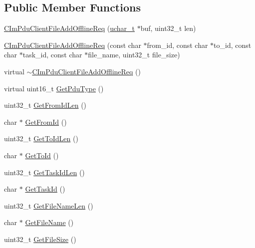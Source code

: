 \subsection*{Public Member Functions}
\begin{DoxyCompactItemize}
\item 
\hyperlink{class_c_im_pdu_client_file_add_offline_req_aee8b88b3267020e47638c945085b718a}{C\+Im\+Pdu\+Client\+File\+Add\+Offline\+Req} (\hyperlink{base_2ostype_8h_a124ea0f8f4a23a0a286b5582137f0b8d}{uchar\+\_\+t} $\ast$buf, uint32\+\_\+t len)
\item 
\hyperlink{class_c_im_pdu_client_file_add_offline_req_a7c333c66a4f4c0ff2dada67fd4155158}{C\+Im\+Pdu\+Client\+File\+Add\+Offline\+Req} (const char $\ast$from\+\_\+id, const char $\ast$to\+\_\+id, const char $\ast$task\+\_\+id, const char $\ast$file\+\_\+name, uint32\+\_\+t file\+\_\+size)
\item 
virtual \hyperlink{class_c_im_pdu_client_file_add_offline_req_a249cb4de01c4e4d28e32a8a709510bbf}{$\sim$\+C\+Im\+Pdu\+Client\+File\+Add\+Offline\+Req} ()
\item 
virtual uint16\+\_\+t \hyperlink{class_c_im_pdu_client_file_add_offline_req_a8c59110b28784a088acb15aae1832ccd}{Get\+Pdu\+Type} ()
\item 
uint32\+\_\+t \hyperlink{class_c_im_pdu_client_file_add_offline_req_ac60ef9c58a29f094d4305d5bb2e154c3}{Get\+From\+Id\+Len} ()
\item 
char $\ast$ \hyperlink{class_c_im_pdu_client_file_add_offline_req_a2b154a0cc54b8dd9b548f02d0f2470fe}{Get\+From\+Id} ()
\item 
uint32\+\_\+t \hyperlink{class_c_im_pdu_client_file_add_offline_req_a97cc09748ab07afa56cb26bdacdd1484}{Get\+To\+Id\+Len} ()
\item 
char $\ast$ \hyperlink{class_c_im_pdu_client_file_add_offline_req_a3b64fdb2a535d81035a3ec34a62029e2}{Get\+To\+Id} ()
\item 
uint32\+\_\+t \hyperlink{class_c_im_pdu_client_file_add_offline_req_acd053a9cf12106edc69e2f01b112ad21}{Get\+Task\+Id\+Len} ()
\item 
char $\ast$ \hyperlink{class_c_im_pdu_client_file_add_offline_req_a1b62f945c5afe6f8bf619e4001ac3908}{Get\+Task\+Id} ()
\item 
uint32\+\_\+t \hyperlink{class_c_im_pdu_client_file_add_offline_req_a2d70a9367b8fdffc336a903a183b7b1c}{Get\+File\+Name\+Len} ()
\item 
char $\ast$ \hyperlink{class_c_im_pdu_client_file_add_offline_req_ae7f7486d4971fd483f55931f81c18358}{Get\+File\+Name} ()
\item 
uint32\+\_\+t \hyperlink{class_c_im_pdu_client_file_add_offline_req_a7cc31cc41b21d12bc5d8d2cc105e9f18}{Get\+File\+Size} ()
\end{DoxyCompactItemize}
